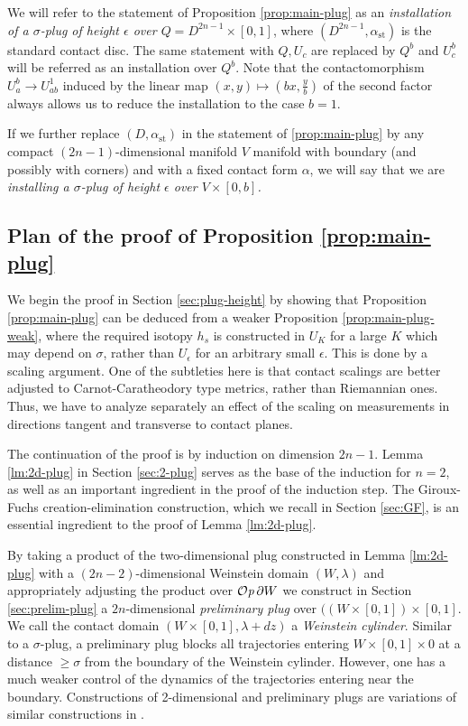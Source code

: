 \documentclass[12pt]{amsart}
\theoremstyle{plain}
\theoremstyle{definition}
\theoremstyle{remark}
\newcommand{\eps}{\epsilon}
\newcommand{\p}{\partial}
\newcommand{\Op}{ {\mathcal O}{\it p}\,}
\newcommand{\st}{\mathrm{st}}
\begin{document}
 
 We will refer to the statement of Proposition \ref{prop:main-plug} as an {\em installation of a $\sigma$-plug  of height $\eps$   over $Q=D^{2n-1}\times [0,1]$}, where $(D^{2n-1},\alpha_\st)$ is  the standard  contact disc. The same statement with $Q, U_c$ are replaced by $Q^b$ and $U^b_c$   will be referred as an installation over $Q^b$. 
  Note that the contactomorphism
 $ U^b_a\to U^1_{ab}$ induced by the   linear map $(x,y)\mapsto(b x,\frac yb)$ of the second factor  always allows us to reduce the installation to the case   $b=1$.
 
  If we further replace $(D,\alpha_\st)$ in  the statement  of \ref{prop:main-plug}  by any compact  $(2n-1)$-dimensional manifold $V$ manifold  with boundary (and possibly with corners) and with a fixed contact form $\alpha$, we will  say that we are {\em installing  a $\sigma$-plug   of height $\eps$   over $V\times[0,b]$.} 
 \subsection{Plan of the proof of Proposition \ref{prop:main-plug}}
 We begin the proof in Section \ref{sec:plug-height} by showing that  Proposition \ref{prop:main-plug} can be deduced from a weaker  
Proposition \ref{prop:main-plug-weak}, where the required isotopy $h_s$ is constructed in $U_K$ for a large  $K$ which may depend on $\sigma$,    rather than $U_\eps$ for an arbitrary small $\eps$.  This is done by a scaling argument.  One  of the subtleties here is  that  contact scalings  are better adjusted  to  Carnot-Caratheodory type metrics, rather than  Riemannian ones. Thus, we have to analyze separately an effect of the scaling on measurements in   directions tangent and transverse to contact planes.

The continuation of the proof is by induction on dimension $2n-1$.  
   Lemma \ref{lm:2d-plug}  in Section \ref{sec:2-plug}   serves as the base of the induction for $n=2$, as well as an   important ingredient in the proof of  the induction  step.  The Giroux-Fuchs creation-elimination construction, which we recall in Section \ref{sec:GF}, is an essential ingredient to the proof of Lemma \ref{lm:2d-plug}.
  
By taking a product of the two-dimensional  plug constructed in Lemma \ref{lm:2d-plug}  with a $(2n-2)$-dimensional Weinstein domain $(W,\lambda)$  and appropriately adjusting the product over  $\Op \p W$ we construct in Section \ref{sec:prelim-plug}  a $2n$-dimensional {\em preliminary plug} over  $((W\times[0,1])\times[0,1]$. We call the contact domain $(W\times[0,1], \lambda+dz)$   a {\em Weinstein cylinder}. Similar to a $\sigma$-plug,  a  preliminary plug blocks all trajectories entering $W\times[0,1]\times0$ at a distance $\geq\sigma$ from the boundary of the Weinstein cylinder. However, one  has a much weaker control of the dynamics of the trajectories entering near the boundary.  Constructions of 2-dimensional and preliminary plugs are variations of similar constructions in  \cite{HH}.
\end{document}
